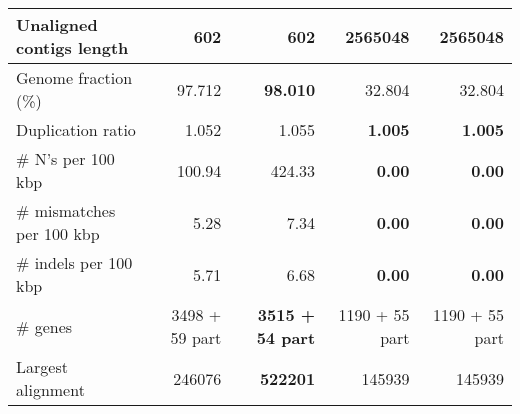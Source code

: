 \documentclass[12pt,a4paper]{article}
\begin{document}
\begin{table}[ht]
\begin{center}
\begin{tabular}{|l*{4}{|r}|}
Unaligned contigs length & {\bf 602} & {\bf 602} & 2565048 & 2565048 \\ \hline
Genome fraction (\%) & 97.712 & {\bf 98.010} & 32.804 & 32.804 \\ \hline
Duplication ratio & 1.052 & 1.055 & {\bf 1.005} & {\bf 1.005} \\ \hline
\# N's per 100 kbp & 100.94 & 424.33 & {\bf 0.00} & {\bf 0.00} \\ \hline
\# mismatches per 100 kbp & 5.28 & 7.34 & {\bf 0.00} & {\bf 0.00} \\ \hline
\# indels per 100 kbp & 5.71 & 6.68 & {\bf 0.00} & {\bf 0.00} \\ \hline
\# genes & 3498 + 59 part & {\bf 3515 + 54 part} & 1190 + 55 part & 1190 + 55 part \\ \hline
Largest alignment & 246076 & {\bf 522201} & 145939 & 145939 \\ \hline
\end{tabular}
\end{center}
\end{table}
\end{document}
